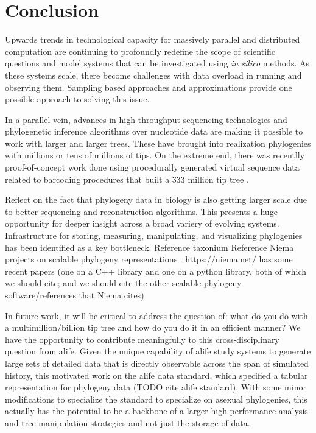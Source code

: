 \section{Conclusion} \label{sec:conclusion}

Upwards trends in technological capacity for massively parallel and distributed computation are continuing to profoundly redefine the scope of scientific questions and model systems that can be investigated using \textit{in silico} methods.
As these systems scale, there become challenges with data overload in running and observing them.
Sampling based approaches and approximations provide one possible approach to solving this issue.

In a parallel vein, advances in high throughput sequencing technologies and phylogenetic inference algorithms over nucleotide data are making it possible to work with larger and larger trees.
These have brought into realization phylogenies with millions or tens of millions of tips.
On the extreme end, there was recentlly proof-of-concept work done using procedurally generated virtual sequence data related to barcoding procedures that built a 333 million tip tree \citep{konno2022deep}.

Reflect on the fact that phylogeny data in biology is also getting larger scale due to better sequencing and reconstruction algorithms.
This presents a huge opportunity for deeper insight across a broad variery of evolving systems.
Infrastructure for storing, measuring, manipulating, and visualizing phylogenies has been identified as a key bottleneck.
Reference taxonium \citep{sanderson2022taxonium}
Reference Niema projects on scalable phylogeny representations \citep{moshiri2025compacttree,moshiri2020treeswift}.
https://niema.net/ has some recent papers (one on a C++ library and one on a python library, both of which we should cite; and we should cite the other scalable phylogeny software/references that Niema cites)

In future work, it will be critical to address the question of:  what do you do with a multimillion/billion tip tree and how do you do it in an efficient manner?
We have the opportunity to contribute meaningfully to this cross-disciplinary question from alife.
Given the unique capability of alife study systems to generate large sets of detailed data that is directly observable across the span of simulated history, this motivated work on the alife data standard, which specified a tabular representation for phylogeny data (TODO cite alife standard).
With some minor modifications to specialize the standard to specialize on asexual phylogenies, this actually has the potential to be a backbone of a larger high-performance analysis and tree manipulation strategies and not just the storage of data.

